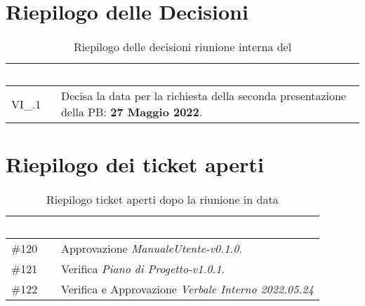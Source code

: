 \section{Riepilogo delle Decisioni}


\begin{table}[!htbp]
    \renewcommand{\arraystretch}{1.5}
    \begin{tabular}{m{}<{\centering}  m{}<{\centering}}
        \rowcolor{darkblue} \textcolor{white}{\textbf{Codice}} & \textcolor{white}{\textbf{Decisione}}                        \\
        \hline
        VI\_{}\D{}.1                                           & Decisa la data per la richiesta della seconda presentazione della PB: \textbf{27 Maggio 2022}. 
    \end{tabular}
    \caption{Riepilogo delle decisioni riunione interna del \D}
\end{table}

\section{Riepilogo dei ticket aperti}

\begin{table}[!htbp]
    \renewcommand{\arraystretch}{1.5}
    \begin{tabular}{m{}<{\centering}  m{}<{\centering}}
        \rowcolor{darkblue} \textcolor{white}{\textbf{Codice}} & \textcolor{white}{\textbf{Descrizione}}                        \\
        \hline
        \#{120}                                         & Approvazione \textit{ManualeUtente-v0.1.0}. \\
        \#{121}										  & Verifica \textit{Piano di Progetto-v1.0.1}. \\
        \#{122}										  & Verifica e Approvazione \textit{Verbale Interno 2022.05.24} \\
    \end{tabular}
    \caption{Riepilogo ticket aperti dopo la riunione in data \D}
\end{table}